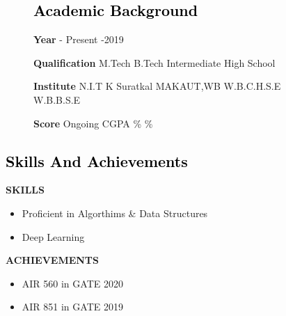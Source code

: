 \documentclass[12pt]{article}
\begin{document}
\begin{figure}[!hbt]
   
      \begin{tcolorbox}
        \subsection*{\textcolor{black}{Academic Background}}
       \end{tcolorbox}
              
       \bigbreak
       \hspace*{0.5in}
   \begin{minipage}{0.22\textwidth}            
		\textbf{Year}        
		 - Present
		 -2019
	\end{minipage}
	\hfill
	\begin{minipage}{0.22\textwidth}
       \textbf{Qualification}        
        \bigbreak  		
		M.Tech
		\bigbreak
		B.Tech
		\bigbreak
		Intermediate
		\bigbreak
		High School
		\end{minipage}
		\hfill
	\begin{minipage}{0.22\textwidth}
		\textbf{Institute}        
        \bigbreak  
        N.I.T K Suratkal
        \bigbreak
        MAKAUT,WB
        \bigbreak
        W.B.C.H.S.E
        \bigbreak
        W.B.B.S.E

	\end{minipage}
	\hfill
	\begin{minipage}{0.22\textwidth}
       \textbf{Score}        
        \bigbreak  	
        Ongoing
         CGPA
        \%
        \%
	\end{minipage}

\end{figure}


\begin{tcolorbox}
\subsection*{\textcolor{black}{Skills And Achievements}}
\end{tcolorbox}
\bigbreak
\hspace*{0.2in}
\begin{minipage}{0.48\textwidth}
\textbf{SKILLS}
\begin{itemize}

\item
Proficient in Algorthims \& Data Structures
\item
Deep Learning
\end{itemize}

\end{minipage}
\hfill
\begin{minipage}{0.48\textwidth}
\textbf{ACHIEVEMENTS}
\begin{itemize}
\item
AIR 560 in GATE 2020
\item
AIR 851 in GATE 2019
\end{itemize}

\end{minipage}
\end{document}
